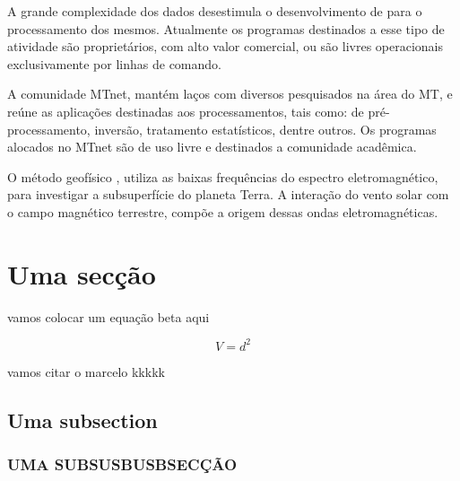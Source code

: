 \documentclass[12pt,twoside,oneright,a4paper,chapter=TITLE,english,brazil]{unipampa}
\begin{document}
    A grande complexidade dos dados desestimula o desenvolvimento de para o processamento dos mesmos. Atualmente os programas destinados a esse tipo de atividade são proprietários,\cite{cagniard1953basic} com alto valor comercial, ou são livres operacionais exclusivamente por linhas de comando.  
    
    A comunidade MTnet, mantém laços com diversos pesquisados na área do MT, e reúne as aplicações destinadas aos processamentos, tais como:  de pré-processamento, inversão, tratamento estatísticos, dentre outros. Os programas alocados no MTnet são de uso livre e destinados a comunidade acadêmica.
    
     O método geofísico , utiliza as baixas frequências do espectro eletromagnético, para investigar a subsuperfície do planeta Terra. A interação do vento solar com o campo magnético terrestre, compõe a origem dessas ondas eletromagnéticas.
     

    \section{Uma secção}
        vamos colocar um equação beta aqui 
        
        \begin{equation}
         V = d^2
        \end{equation}
        
        vamos citar o marcelo kkkkk \cite{padua2004estudos}

    
    \subsection{Uma subsection}
    \subsubsection{UMA SUBSUSBUSBSECÇÃO}
    
\end{document}
